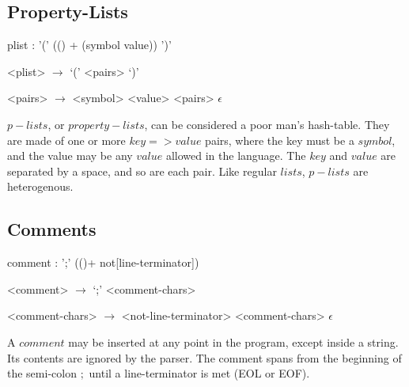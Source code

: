 \documentclass[a4paper]{article}
\begin{document}
\subsection{Property-Lists}
\begin{rail}
	plist : '(' (() + (symbol value)) ')'
\end{rail}

\begin{grammar}
	<plist> $\to$ `(' <pairs> `)'

	<pairs> $\to$ <symbol> <value> <pairs>
		\alt $\epsilon$
\end{grammar}

$p-lists$, or $property-lists$, can be considered a poor man's hash-table. They are made of one or more $key => value$ pairs, where the key must be a $symbol$, and the value may be any $value$ allowed in the language. The $key$ and $value$ are separated by a space, and so are each pair. Like regular $lists$, $p-lists$ are heterogenous.

\subsection{Comments}
\begin{rail}
	comment : ';' (()+ not[line-terminator])
\end{rail}

\begin{grammar}
	<comment> $\to$ `;' <comment-chars>

	<comment-chars> $\to$ <not-line-terminator> <comment-chars>
		\alt $\epsilon$
\end{grammar}

A $comment$ may be inserted at any point in the program, except inside a string. Its contents are ignored by the parser. The comment spans from the beginning of the semi-colon $;$ until a line-terminator is met (EOL or EOF).
\end{document}
